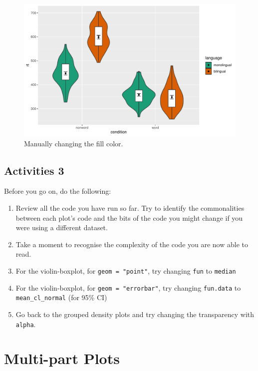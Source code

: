 \documentclass[
  english,
  doc,floatsintext]{apa6}
\begin{document}
\begin{figure}

{\centering \includegraphics[width=1\linewidth]{images/viobox5-1} 

}

\caption{Manually changing the fill color.}\label{fig:viobox5}
\end{figure}

\hypertarget{activities-3}{%
\subsection{Activities 3}\label{activities-3}}

Before you go on, do the following:

\begin{enumerate}
\def\labelenumi{\arabic{enumi}.}
\item
  Review all the code you have run so far. Try to identify the commonalities between each plot's code and the bits of the code you might change if you were using a different dataset.
\item
  Take a moment to recognise the complexity of the code you are now able to read.
\item
  For the violin-boxplot, for \texttt{geom\ =\ "point"}, try changing \texttt{fun} to \texttt{median}
\item
  For the violin-boxplot, for \texttt{geom\ =\ "errorbar"}, try changing \texttt{fun.data} to \texttt{mean\_cl\_normal} (for 95\% CI)
\item
  Go back to the grouped density plots and try changing the transparency with \texttt{alpha}.
\end{enumerate}

\hypertarget{multi-part-plots}{%
\section{Multi-part Plots}\label{multi-part-plots}}
\end{document}
